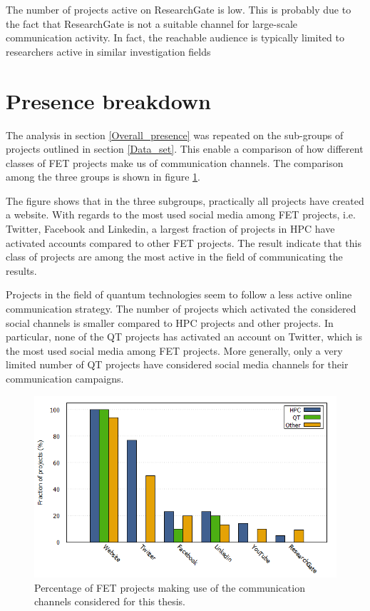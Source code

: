 The number of projects active on ResearchGate is low. This is probably due to the fact that ResearchGate is not a suitable channel for large-scale communication activity. In fact, the reachable audience is typically limited to researchers active in similar investigation fields

\section{Presence breakdown}
The analysis in section \ref{Overall_presence} was repeated on the sub-groups of projects outlined in section \ref{Data_set}. This enable a comparison of how different classes of FET projects make us of communication channels. The comparison among the three groups is shown in figure \ref{Social_media_breakdown}. 

The figure shows that in the three subgroups, practically all projects have created a website. With regards to the most used social media among FET projects, i.e. Twitter, Facebook and Linkedin, a largest fraction of projects in HPC have activated accounts compared to other FET projects. The result indicate that this class of projects are among the most active in the field of communicating the results.

Projects in the field of quantum technologies seem to follow a less active online communication strategy. The number of projects which activated the considered social channels is smaller compared to HPC projects and other projects. In particular, none of the QT projects has activated an account on Twitter, which is the most used social media among FET projects. More generally, only a very limited number of QT projects have considered social media channels for their communication campaigns.

     

\begin{figure}[!t] 
 \begin{center}
 \includegraphics[scale=0.4]{Images/Social_media_breakdown.png}
 \caption{Percentage of FET projects making use of the communication channels considered for this thesis.}
 \label{Social_media_breakdown}
 \end{center}
\end{figure}